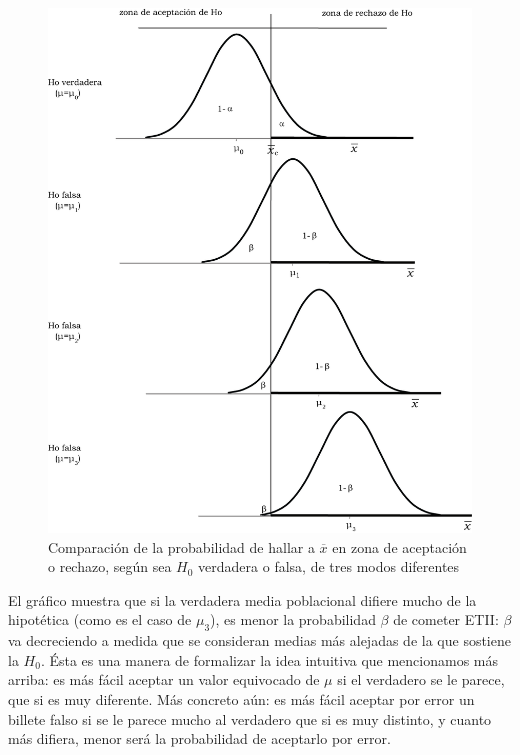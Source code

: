 \documentclass[]{book}
\begin{document}
\begin{figure}

{\centering \includegraphics[width=16.35in]{imagenes/image188} 

}

\caption{Comparación de la probabilidad de hallar a $\overline{x}$ en zona de aceptación o rechazo, según sea $H_0$ verdadera o falsa, de tres modos diferentes}\label{fig:compHallarX}
\end{figure}

El gráfico muestra que si la verdadera media poblacional difiere mucho
de la hipotética (como es el caso de \(\mu_{3}\)), es menor la probabilidad \(\beta\) de cometer ETII: \(\beta\) va decreciendo a medida que se consideran medias más alejadas de la que sostiene la \(H_{0}\). Ésta es una manera de formalizar la idea intuitiva que mencionamos más arriba: es más fácil aceptar un valor equivocado de \(\mu\) si el verdadero se le parece, que si es muy diferente.
Más concreto aún: es más fácil aceptar por error un billete falso si se
le parece mucho al verdadero que si es muy distinto, y cuanto más difiera, menor será la probabilidad de aceptarlo por error.
\end{document}
